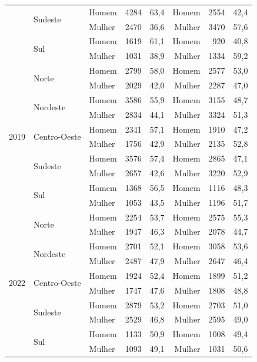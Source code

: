 \documentclass[12pt,a4paper,header]{abnt}
\begin{document}
\begin{center}
\begin{longtable}{llllrrrr}
& \multirow{2}{*}{Sudeste} & Homem & 4284 & 63,4 & Homem & 2554 & 42,4 \\
\nopagebreak
& & Mulher & 2470 & 36,6 & Mulher & 3470 & 57,6 \\
& \multirow{2}{*}{Sul} & Homem & 1619 & 61,1 & Homem & 920 & 40,8 \\
\nopagebreak
& & Mulher & 1031 & 38,9 & Mulher & 1334 & 59,2 \\
\midrule
\multirow{10}{*}{2019} & \multirow{2}{*}{Norte} & Homem & 2799 & 58,0 & Homem & 2577 & 53,0 \\
\nopagebreak
& & Mulher & 2029 & 42,0 & Mulher & 2287 & 47,0 \\
& \multirow{2}{*}{Nordeste} & Homem & 3586 & 55,9 & Homem & 3155 & 48,7 \\
\nopagebreak
& & Mulher & 2834 & 44,1 & Mulher & 3324 & 51,3 \\
& \multirow{2}{*}{Centro-Oeste} & Homem & 2341 & 57,1 & Homem & 1910 & 47,2 \\
\nopagebreak
& & Mulher & 1756 & 42,9 & Mulher & 2135 & 52,8 \\
& \multirow{2}{*}{Sudeste} & Homem & 3576 & 57,4 & Homem & 2865 & 47,1 \\
\nopagebreak
& & Mulher & 2657 & 42,6 & Mulher & 3220 & 52,9 \\
& \multirow{2}{*}{Sul} & Homem & 1368 & 56,5 & Homem & 1116 & 48,3 \\
\nopagebreak
& & Mulher & 1053 & 43,5 & Mulher & 1196 & 51,7 \\
\midrule
\multirow{10}{*}{2022} & \multirow{2}{*}{Norte} & Homem & 2254 & 53,7 & Homem & 2575 & 55,3 \\
\nopagebreak
& & Mulher & 1947 & 46,3 & Mulher & 2078 & 44,7 \\
& \multirow{2}{*}{Nordeste} & Homem & 2701 & 52,1 & Homem & 3058 & 53,6 \\
\nopagebreak
& & Mulher & 2487 & 47,9 & Mulher & 2647 & 46,4 \\
& \multirow{2}{*}{Centro-Oeste} & Homem & 1924 & 52,4 & Homem & 1899 & 51,2 \\
\nopagebreak
& & Mulher & 1747 & 47,6 & Mulher & 1808 & 48,8 \\
& \multirow{2}{*}{Sudeste} & Homem & 2879 & 53,2 & Homem & 2703 & 51,0 \\
\nopagebreak
& & Mulher & 2529 & 46,8 & Mulher & 2595 & 49,0 \\
& \multirow{2}{*}{Sul} & Homem & 1133 & 50,9 & Homem & 1008 & 49,4 \\
\nopagebreak
& & Mulher & 1093 & 49,1 & Mulher & 1031 & 50,6 \\

\end{longtable}
\end{center}
\end{document}
